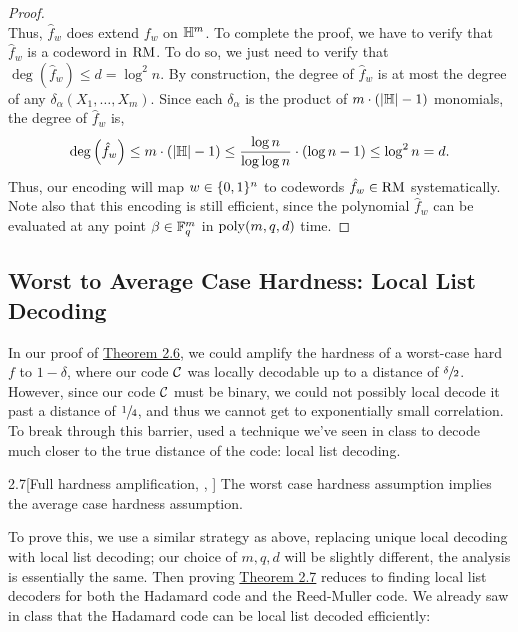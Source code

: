 \documentclass[11pt]{article}
\begin{document}
\begin{proof}
\begin{equation*}
    \end{equation*}
    Thus, $\hat{f}_w$ does extend $f_w$ on $\mathbb{H}^m$. To complete the proof, we have to verify that $\hat{f}_w$ is a codeword in $\mathrm{RM}$. To do so, we just need to verify that $\deg(\hat{f}_w) \leq d = \log^2 n$. By construction, the degree of $\hat{f}_w$ is at most the degree of any $\delta_\alpha(X_1, \ldots, X_m)$. Since each $\delta_\alpha$ is the product of $m \cdot (|\mathbb{H}| - 1)$ monomials, the degree of $\hat{f}_w$ is,
    \begin{equation*}
        \deg \left(\hat{f}_w\right) \leq m \cdot (|\mathbb{H}| - 1) \leq \frac{\log n}{\log \log n} \cdot \left(\log n - 1\right) \leq \log^2 n = d.
    \end{equation*}
    Thus, our encoding will map $w \in \{0, 1\}^n$ to codewords $\hat{f}_w \in \mathrm{RM}$ systematically. Note also that this encoding is still efficient, since the polynomial $\hat{f}_w$ can be evaluated at any point $\beta \in \mathbb{F}_q^m$ in $\mathrm{poly}(m, q, d)$ time.
\end{proof}

\subsection{Worst to Average Case Hardness: Local List Decoding}

In our proof of \hyperref[t-2-6]{Theorem 2.6}, we could amplify the hardness of a worst-case hard $f$ to $1 - \delta$, where our code $\mathcal{C}$ was locally decodable up to a distance of $\sfrac{\delta}{2}$. However, since our code $\mathcal{C}$ must be binary, we could not possibly local decode it past a distance of $\sfrac{1}{4}$, and thus we cannot get to exponentially small correlation. To break through this barrier, \cite{STV99} used a technique we've seen in class to decode much closer to the true distance of the code: local list decoding.

\begin{theorem}{2.7}[Full hardness amplification, \cite{iw97}, \cite{STV99}]\label{t-2-7}
    The worst case hardness assumption implies the average case hardness assumption.
\end{theorem}

To prove this, we use a similar strategy as above, replacing unique local decoding with local list decoding; our choice of $m, q, d$ will be slightly different, the analysis is essentially the same. Then proving \hyperref[t-2-7]{Theorem 2.7} reduces to finding local list decoders for both the Hadamard code and the Reed-Muller code. We already saw in class that the Hadamard code can be local list decoded efficiently:
\end{document}
